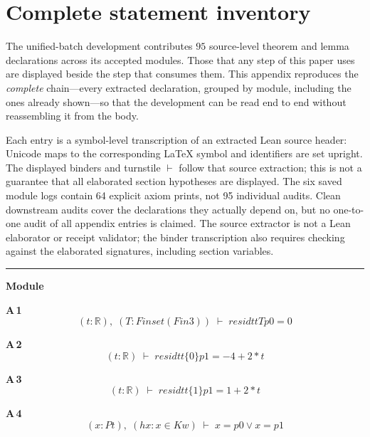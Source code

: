\appendices
\section{Complete statement inventory}
\label{app:inventory}

The unified-batch development contributes $95$ source-level theorem and lemma declarations across its accepted modules. Those that any step of this paper uses are displayed beside the step that consumes them. This appendix reproduces the \emph{complete} chain---every extracted declaration, grouped by module, including the ones already shown---so that the development can be read end to end without reassembling it from the body.

Each entry is a symbol-level transcription of an extracted Lean source header: Unicode maps to the corresponding \LaTeX{} symbol and identifiers are set upright. The displayed binders and turnstile $\vdash$ follow that source extraction; this is not a guarantee that all elaborated section hypotheses are displayed. The six saved module logs contain 64 explicit axiom prints, not 95 individual
audits. Clean downstream audits cover the declarations they actually depend on, but no
one-to-one audit of all appendix entries is claimed. The source extractor is not a Lean
elaborator or receipt validator; the binder transcription also requires checking against
the elaborated signatures, including section variables.

\vspace{4pt}\noindent\rule{\columnwidth}{0.4pt}\par\vspace{2pt}
\noindent\textbf{Module }\par\vspace{3pt}

\noindent\textbf{A\,1}\quad{}
{\footnotesize\[ (\mathit{t} : \mathbb{R} ),\; (\mathit{T} : \mathit{Finset} (\mathit{Fin} 3)) \;\vdash\; \mathit{residt} \mathit{t} \mathit{T} \mathit{p0} = 0 \]}

\noindent\textbf{A\,2}\quad{}
{\footnotesize\[ (\mathit{t} : \mathbb{R} ) \;\vdash\; \mathit{residt} \mathit{t} \{ 0\} \mathit{p1} = -4 + 2 * \mathit{t} \]}

\noindent\textbf{A\,3}\quad{}
{\footnotesize\[ (\mathit{t} : \mathbb{R} ) \;\vdash\; \mathit{residt} \mathit{t} \{ 1\} \mathit{p1} = 1 + 2 * \mathit{t} \]}

\noindent\textbf{A\,4}\quad{}
{\footnotesize\[ (\mathit{x} : \mathit{Pt}),\; (\mathit{hx} : \mathit{x} \in \mathit{Kw}) \;\vdash\; \mathit{x} = \mathit{p0} \vee \mathit{x} = \mathit{p1} \]}

